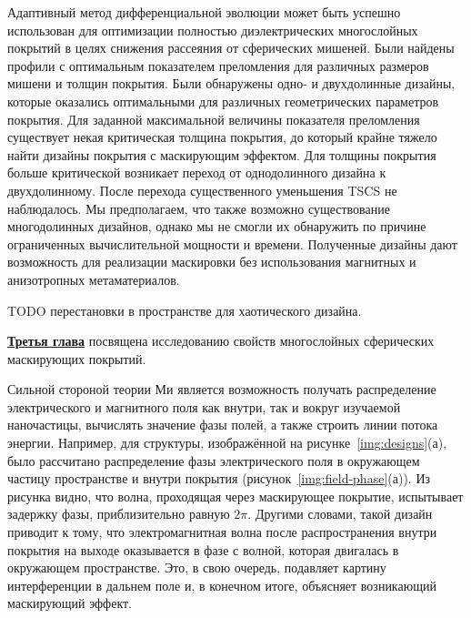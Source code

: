 Адаптивный метод дифференциальной эволюции может быть успешно
использован для оптимизации полностью диэлектрических многослойных
покрытий в целях снижения рассеяния от сферических мишеней.  Были
найдены профили с оптимальным показателем преломления для различных
размеров мишени и толщин покрытия.  Были обнаружены одно- и
двухдолинные дизайны, которые оказались оптимальными для различных
геометрических параметров покрытия.  Для заданной максимальной
величины показателя преломления существует некая критическая толщина
покрытия, до который крайне тяжело найти дизайны покрытия с
маскирующим эффектом.  Для толщины покрытия больше критической
возникает переход от однодолинного дизайна к двухдолинному.  После
перехода существенного уменьшения TSCS не наблюдалось.  Мы
предполагаем, что также возможно существование многодолинных дизайнов,
однако мы не смогли их обнаружить по причине ограниченных
вычислительной мощности и времени.  Полученные дизайны дают
возможность для реализации маскировки без использования магнитных и
анизотропных метаматериалов.
   


TODO перестановки в пространстве для хаотического дизайна.

\underline{\textbf{Третья глава}} посвящена исследованию свойств
многослойных сферических маскирующих покрытий.


Сильной стороной теории Ми является возможность получать распределение
электрического и магнитного поля как внутри, так и вокруг изучаемой
наночастицы, вычислять значение фазы полей, а также строить линии
потока энергии.  Например, для структуры, изображённой на
рисунке~\ref{img:designs}(а), было рассчитано распределение фазы
электрического поля в окружающем частицу пространстве и внутри
покрытия (рисунок~\ref{img:field-phase}(а)).  Из рисунка видно, что
волна, проходящая через маскирующее покрытие, испытывает задержку фазы,
приблизительно равную $2\pi$. Другими словами, такой дизайн приводит к
тому, что электромагнитная волна после распространения внутри покрытия
на выходе оказывается в фазе с волной, которая двигалась в окружающем
пространстве.  Это, в свою очередь, подавляет картину интерференции в
дальнем поле и, в конечном итоге, объясняет возникающий маскирующий
эффект.

